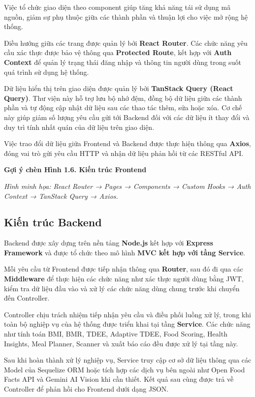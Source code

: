\documentclass[12pt, a4paper]{report}
\begin{document}
Việc tổ chức giao diện theo component giúp tăng khả năng tái sử dụng mã nguồn, giảm sự phụ thuộc giữa các thành phần và thuận lợi cho việc mở rộng hệ thống.

Điều hướng giữa các trang được quản lý bởi \textbf{React Router}. Các chức năng yêu cầu xác thực được bảo vệ thông qua \textbf{Protected Route}, kết hợp với \textbf{Auth Context} để quản lý trạng thái đăng nhập và thông tin người dùng trong suốt quá trình sử dụng hệ thống.

Dữ liệu hiển thị trên giao diện được quản lý bởi \textbf{TanStack Query (React Query)}. Thư viện này hỗ trợ lưu bộ nhớ đệm, đồng bộ dữ liệu giữa các thành phần và tự động cập nhật dữ liệu sau các thao tác thêm, sửa hoặc xóa. Cơ chế này giúp giảm số lượng yêu cầu gửi tới Backend đối với các dữ liệu ít thay đổi và duy trì tính nhất quán của dữ liệu trên giao diện.

Việc trao đổi dữ liệu giữa Frontend và Backend được thực hiện thông qua \textbf{Axios}, đóng vai trò gửi yêu cầu HTTP và nhận dữ liệu phản hồi từ các RESTful API.

\textbf{Gợi ý chèn Hình 1.6. Kiến trúc Frontend}

\textit{Hình minh họa: React Router → Pages → Components → Custom Hooks → Auth Context → TanStack Query → Axios.}

\subsection{Kiến trúc Backend}Backend được xây dựng trên nền tảng \textbf{Node.js} kết hợp với \textbf{Express Framework} và được tổ chức theo mô hình \textbf{MVC kết hợp với tầng Service}.

Mỗi yêu cầu từ Frontend được tiếp nhận thông qua \textbf{Router}, sau đó đi qua các \textbf{Middleware} để thực hiện các chức năng như xác thực người dùng bằng JWT, kiểm tra dữ liệu đầu vào và xử lý các chức năng dùng chung trước khi chuyển đến Controller.

Controller chịu trách nhiệm tiếp nhận yêu cầu và điều phối luồng xử lý, trong khi toàn bộ nghiệp vụ của hệ thống được triển khai tại tầng \textbf{Service}. Các chức năng như tính toán BMI, BMR, TDEE, Adaptive TDEE, Food Scoring, Health Insights, Meal Planner, Scanner và xuất báo cáo đều được xử lý tại tầng này.

Sau khi hoàn thành xử lý nghiệp vụ, Service truy cập cơ sở dữ liệu thông qua các Model của Sequelize ORM hoặc tích hợp các dịch vụ bên ngoài như Open Food Facts API và Gemini AI Vision khi cần thiết. Kết quả sau cùng được trả về Controller để phản hồi cho Frontend dưới dạng JSON.
\end{document}
